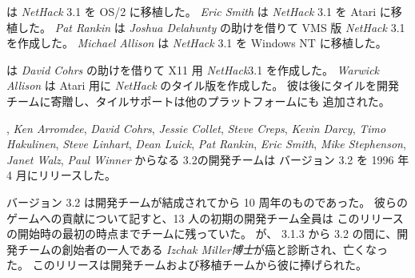 \medskip
 は {\it NetHack\/} 3.1 を OS/2 に移植した。
{\it Eric Smith} は {\it NetHack\/} 3.1 を Atari に移植した。
{\it Pat Rankin} は {\it Joshua Delahunty} の助けを借りて VMS 版
{\it NetHack\/} 3.1 を作成した。
{\it Michael Allison} は {\it NetHack\/} 3.1 を Windows NT に移植した。

\medskip
 は {\it David Cohrs} の助けを借りて X11 用
{\it NetHack\/}3.1 を作成した。
{\it Warwick Allison} は Atari 用に {\it NetHack\/} のタイル版を作成した。
彼は後にタイルを開発チームに寄贈し、タイルサポートは他のプラットフォームにも
追加された。

\medskip
, {\it Ken Arromdee},
{\it David Cohrs}, {\it Jessie Collet}, {\it Steve Creps},
{\it Kevin Darcy}, {\it Timo Hakulinen}, {\it Steve Linhart}, {\it Dean Luick},
{\it Pat Rankin}, {\it Eric Smith}, {\it Mike Stephenson}, {\it Janet Walz},
{\it Paul Winner} からなる 3.2の開発チームは バージョン 3.2 を
1996 年 4 月にリリースした。

\medskip
\nd バージョン 3.2 は開発チームが結成されてから 10 周年のものであった。
彼らのゲームへの貢献について記すと、13 人の初期の開発チーム全員は
このリリースの開始時の最初の時点までチームに残っていた。
が、 3.1.3 から 3.2 の間に、開発チームの創始者の一人である
{\it Izchak Miller博士}が癌と診断され、亡くなった。
このリリースは開発チームおよび移植チームから彼に捧げられた。

